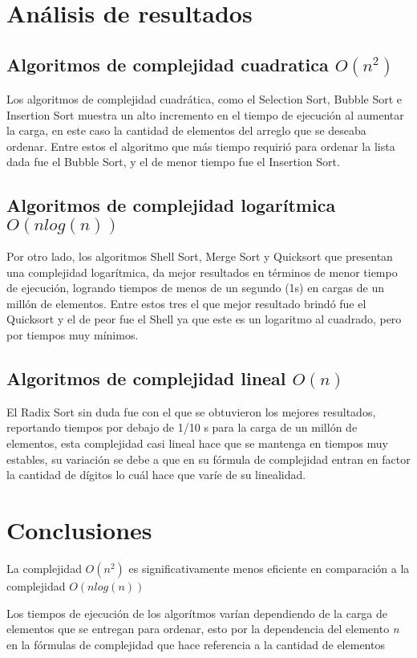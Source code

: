 \documentclass{report}
\begin{document}
	\section*{ Análisis de resultados}
	\subsection*{Algoritmos de complejidad cuadratica $O(n^{2})$}
	Los algoritmos de complejidad cuadrática, como el Selection Sort, Bubble Sort e Insertion Sort muestra un alto incremento en el tiempo de ejecución al aumentar la carga, en este caso la cantidad de elementos del arreglo que se deseaba ordenar. Entre estos el algoritmo que más tiempo requirió para ordenar la lista dada fue el Bubble Sort, y el de menor tiempo fue el Insertion Sort.
	\subsection*{Algoritmos de complejidad logarítmica $O(nlog(n))$}
	Por otro lado, los algoritmos Shell Sort, Merge Sort y Quicksort que presentan una complejidad logarítmica, da mejor resultados en términos de menor tiempo de ejecución, logrando tiempos de menos de un segundo (1s) en cargas de un millón de elementos. Entre estos tres el que mejor resultado brindó fue el Quicksort y el de peor fue el Shell ya que este es un logaritmo al cuadrado, pero por tiempos muy mínimos.
	\subsection*{Algoritmos de complejidad lineal $O(n)$}
	El Radix Sort sin duda fue con el que se obtuvieron los mejores resultados, reportando tiempos por debajo de 1/10 s para la carga de un millón de elementos, esta complejidad casi lineal hace que se mantenga en tiempos muy estables, su variación se debe a que en su fórmula de complejidad entran en factor la cantidad de dígitos lo cuál hace que varíe de su linealidad.
	\section*{Conclusiones} La complejidad $O(n^2)$ es significativamente menos eficiente en comparación a la complejidad $O(nlog(n))$   
	
	Los tiempos de ejecución de los algorítmos varían dependiendo de la carga de elementos que se entregan para ordenar, esto por la dependencia del elemento \textit{n} en la fórmulas de complejidad que hace referencia a la cantidad de elementos
	
\end{document}
